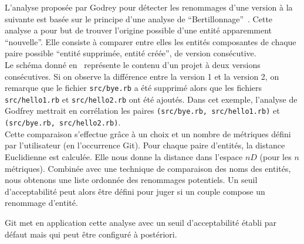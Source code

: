 L'analyse proposée par Godrey pour détecter les renommages d'une version à la suivante est basée sur le principe d'une analyse de ``Bertillonnage''~\cite{bertillonnage}. Cette analyse a pour but de trouver l’origine possible d’une entité apparemment ``nouvelle''. Elle consiste à comparer entre elles les entités composantes de chaque paire possible ``entité supprimée, entité créée'', de version consécutive.\\ 

Le schéma donné en~ représente le contenu d'un projet à deux versions consécutives. Si on observe la différence entre la version 1 et la version 2, on remarque que le fichier \texttt{src/bye.rb} a été supprimé alors que les fichiers \texttt{src/hello1.rb} et \texttt{src/hello2.rb} ont été ajoutés.
Dans cet exemple, l'analyse de Godfrey mettrait en corrélation les paires \texttt{(src/bye.rb, src/hello1.rb)} et \texttt{(src/bye.rb, src/hello2.rb)}.\\  

Cette comparaison s'effectue grâce à un choix et un nombre de métriques défini par l'utilisateur (en l'occurrence Git). Pour chaque paire d'entités, la distance Euclidienne est calculée. Elle nous donne la distance dans l’espace $nD$ (pour les $n$ métriques). Combinée avec une technique de comparaison des noms des entités, nous obtenons une liste ordonnée des renommages potentiels. Un seuil d'acceptabilité peut alors être défini pour juger si un couple compose un renommage d'entité.

Git met en application cette analyse avec un seuil d'acceptabilité établi par défaut mais qui peut être configuré à postériori.\\



